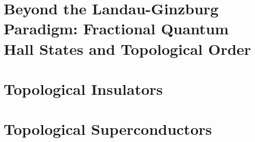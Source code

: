 \documentclass[11pt]{article}
\begin{document}
\section{Beyond the Landau-Ginzburg Paradigm: Fractional Quantum Hall States and Topological Order}

\section{Topological Insulators}

\section{Topological Superconductors}



\newpage
\vskip 0.5cm
\end{document}
